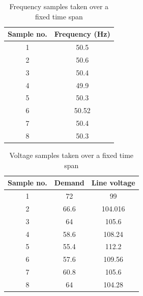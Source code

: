 \documentclass[a4paper,12pt,oneside]{book}
\begin{document}
    \begin{table}[ht]
      \centering
      \caption{Frequency samples taken over  a fixed time span\cite{8586572}}
      \begin{tabular}{|c|c|}
      \hline
      \textbf{Sample no.} & \textbf{Frequency (Hz)} \\
      \hline
      1 & 50.5 \\
      2 & 50.6 \\
      3 & 50.4 \\
      4 & 49.9 \\
      5 & 50.3 \\
      6 & 50.52 \\
      7 & 50.4 \\
      8 & 50.3 \\
      \hline
      \end{tabular}
      \label{tab:frequency-samples}
      \end{table}

      \begin{table}[h!]
        \centering
        \caption{Voltage samples taken over a fixed time span\cite{9230639}}
        \begin{tabular}{|c|c|c|}
        \hline
        \textbf{Sample no.} & \textbf{Demand} & \textbf{Line voltage} \\
        \hline
        1 & 72 & 99 \\
        2 & 66.6 & 104.016 \\
        3 & 64 & 105.6 \\
        4 & 58.6 & 108.24 \\
        5 & 55.4 & 112.2 \\
        6 & 57.6 & 109.56 \\
        7 & 60.8 & 105.6 \\
        8 & 64 & 104.28 \\
        \hline
        \end{tabular}
        \label{tab:voltage-samples}
        \end{table}

  \newpage
\end{document}
